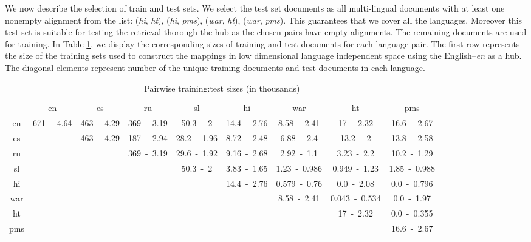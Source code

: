\documentclass{article} %
\begin{document}
We now describe the selection of train and test sets. We select the test set documents as all multi-lingual documents with at least one nonempty alignment from the list: (\emph{hi}, \emph{ht}), (\emph{hi}, \emph{pms}), (\emph{war}, \emph{ht}), (\emph{war}, \emph{pms}). This guarantees that we cover all the languages. Moreover this test set is suitable for testing the retrieval thorough the hub as
the chosen pairs have empty alignments.
The remaining documents are used for training.
In Table \ref{table:train_test}, we display the corresponding sizes of training and test documents for each language pair.
The first row represents the size of the training sets used to construct the mappings in low dimensional language independent space using the English--\emph{en} as a hub.
The diagonal elements represent number of the unique training documents and test documents in each language.
{
\renewcommand\tabcolsep{3pt}
\begin{table}[h!]
\caption{Pairwise training:test sizes (in thousands)}
\label{table:train_test}
{
\small
\begin{tabular}{c|c|c|c|c|c|c|c|c|}
&	en&	es&	ru&	sl&	hi&	war&	ht&	pms\\\cline{1-9}
en&	671~-~4.64&	463~-~4.29&	369~-~3.19&	50.3~-~2&	14.4~-~2.76&	8.58~-~2.41&	17~-~2.32&	16.6~-~2.67\\
\cline{2-9}
es&	\multicolumn{1}{c|}{}	&	463~-~4.29&	187~-~2.94&	28.2~-~1.96&	8.72~-~2.48&	6.88~-~2.4&	13.2~-~2&	 13.8~-~2.58\\
\cline{3-9}
ru&	\multicolumn{2}{c|}{}	&	369~-~3.19&	29.6~-~1.92&	9.16~-~2.68&	2.92~-~1.1&	3.23~-~2.2&	10.2~-~1.29\\
\cline{4-9}
sl&	\multicolumn{3}{c|}{}	&	50.3~-~2&	3.83~-~1.65&	1.23~-~0.986&	0.949~-~1.23&	1.85~-~0.988\\
\cline{5-9}
hi&	\multicolumn{4}{c|}{}	&	14.4~-~2.76&	0.579~-~0.76&	0.0~-~2.08&	0.0~-~0.796\\
\cline{6-9}
war&	\multicolumn{5}{c|}{}	&	8.58~-~2.41&	0.043~-~0.534&	0.0~-~1.97\\
\cline{7-9}
ht&	\multicolumn{6}{c|}{}	&	17~-~2.32&	0.0~-~0.355\\
\cline{8-9}
pms&	\multicolumn{7}{c|}{}	&	16.6~-~2.67\\
\cline{9-9}
\end{tabular}
}
\end{table}
}
\end{document}
